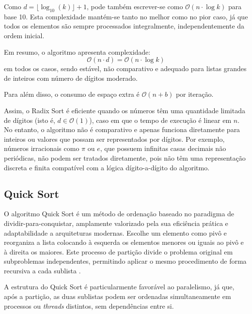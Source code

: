 \documentclass[conference]{IEEEtran}
\begin{document}
Como \( d = \lfloor \log_{10}(k) \rfloor + 1 \), pode também escrever-se como \(\mathcal{O}(n \cdot \log k)\) para base 10. Esta complexidade mantém-se tanto no melhor como no pior caso, já que todos os elementos são sempre processados integralmente, independentemente da ordem inicial.

Em resumo, o algoritmo apresenta complexidade:
\[
\mathcal{O}(n \cdot d) = \mathcal{O}(n \cdot \log k)
\]
em todos os casos, sendo estável, não comparativo e adequado para listas grandes de inteiros com número de dígitos moderado.

Para além disso, o consumo de espaço extra é \(\mathcal{O}(n + b)\) por iteração.

Assim, o Radix Sort é eficiente quando os números têm uma quantidade limitada de dígitos (isto é, \( d \in \mathcal{O}(1) \)), caso em que o tempo de execução é linear em \( n \). No entanto, o algoritmo não é comparativo e apenas funciona diretamente para inteiros ou valores que possam ser representados por dígitos. Por exemplo, números irracionais como \( \pi \) ou \( e \), que possuem infinitas casas decimais não periódicas, não podem ser tratados diretamente, pois não têm uma representação discreta e finita compatível com a lógica dígito-a-dígito do algoritmo.

\subsection{Quick Sort}

O algoritmo Quick Sort é um método de ordenação baseado no paradigma de dividir-para-conquistar, amplamente valorizado pela sua eficiência prática e adaptabilidade a arquiteturas modernas. Escolhe um elemento como pivô e reorganiza a lista colocando à esquerda os elementos menores ou iguais ao pivô e à direita os maiores. Este processo de partição divide o problema original em subproblemas independentes, permitindo aplicar o mesmo procedimento de forma recursiva a cada sublista \cite{quicksort}.

A estrutura do Quick Sort é particularmente favorável ao paralelismo, já que, após a partição, as duas sublistas podem ser ordenadas simultaneamente em processos ou \textit{threads} distintos, sem dependências entre si.
\end{document}
